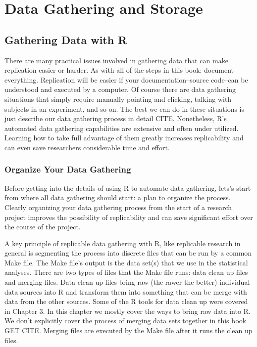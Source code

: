 \documentclass[ChapterTOCs,krantz1]{krantz}\usepackage{graphicx, color}
\begin{document}
\part{Data Gathering and Storage}





\chapter{Gathering Data with R}\label{DataGather}

There are many practical issues involved in gathering data that can make replication easier or harder. As with all of the steps in this book: document everything. Replication will be easier if your documentation--source code--can be understood and executed by a computer. Of course there are data gathering situations that simply require manually pointing and clicking, talking with subjects in an experiment, and so on. The best we can do in these situations is just describe our data gathering process in detail CITE. Nonetheless, R's automated data gathering capabilities are extensive and often under utilized. Learning how to take full advantage of them greatly increases replicability and can even save researchers considerable time and effort.

\section{Organize Your Data Gathering}

Before getting into the details of using R to automate data gathering, lets's start from where all data gathering should start: a plan to organize the process. Clearly organizing your data gathering process from the start of a research project improves the possibility of replicability and can save significant effort over the course of the project. 

A key principle of replicable data gathering with R, like replicable research in general is segmenting the process into discrete files that can be run by a common Make file. The Make file's output is the data set(s) that we use in the statistical analyses. There are two types of files that the Make file runs: data clean up files and merging files. Data clean up files bring raw (the rawer the better) individual data sources into R and transform them into something that can be merge with data from the other sources. Some of the R tools for data clean up were covered in Chapter 3. In this chapter we mostly cover the ways to bring raw data into R. We don't explicitly cover the process of merging data sets together in this book GET CITE. Merging files are executed by the Make file after it runs the clean up files.
\end{document}
